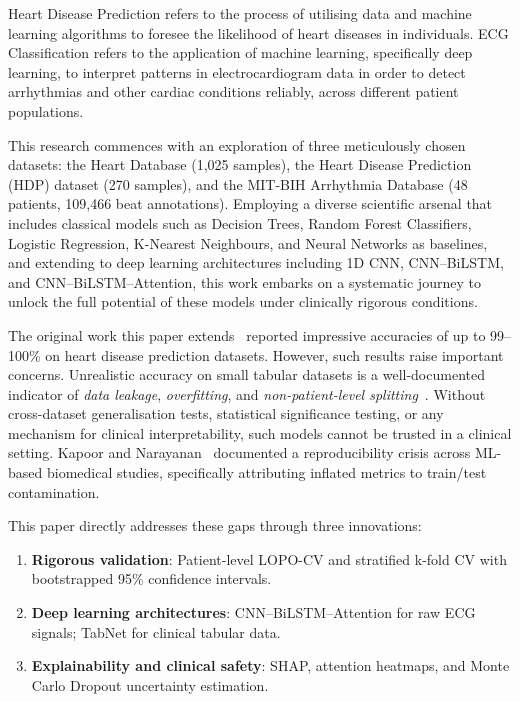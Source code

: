 \documentclass[10pt, twocolumn]{article}
\begin{document}
Heart Disease Prediction refers to the process of utilising data and machine learning
algorithms to foresee the likelihood of heart diseases in individuals.
ECG Classification refers to the application of machine learning, specifically deep learning,
to interpret patterns in electrocardiogram data in order to detect arrhythmias and other
cardiac conditions reliably, across different patient populations.

This research commences with an exploration of three meticulously chosen datasets: the Heart
Database (1,025 samples), the Heart Disease Prediction (HDP) dataset (270 samples), and the
MIT-BIH Arrhythmia Database (48 patients, 109,466 beat annotations).
Employing a diverse scientific arsenal that includes classical models such as Decision Trees,
Random Forest Classifiers, Logistic Regression, K-Nearest Neighbours, and Neural Networks
as baselines, and extending to deep learning architectures including 1D CNN, CNN--BiLSTM,
and CNN--BiLSTM--Attention, this work embarks on a systematic journey to unlock the full
potential of these models under clinically rigorous conditions.

\medskip
\noindent The original work this paper extends~\cite{anbuselvan2020} reported impressive
accuracies of up to 99--100\% on heart disease prediction datasets.
However, such results raise important concerns.
Unrealistic accuracy on small tabular datasets is a well-documented indicator of
\textit{data leakage}, \textit{overfitting}, and \textit{non-patient-level splitting}~\cite{kapoor2023}.
Without cross-dataset generalisation tests, statistical significance testing, or any mechanism
for clinical interpretability, such models cannot be trusted in a clinical setting.
Kapoor and Narayanan~\cite{kapoor2023} documented a reproducibility crisis across ML-based
biomedical studies, specifically attributing inflated metrics to train/test contamination.

This paper directly addresses these gaps through three innovations:
\begin{enumerate}[leftmargin=*, label=\textbf{\arabic*.}]
  \item \textbf{Rigorous validation}: Patient-level LOPO-CV and stratified k-fold CV with
        bootstrapped 95\% confidence intervals.
  \item \textbf{Deep learning architectures}: CNN--BiLSTM--Attention for raw ECG signals;
        TabNet for clinical tabular data.
  \item \textbf{Explainability and clinical safety}: SHAP, attention heatmaps, and
        Monte Carlo Dropout uncertainty estimation.
\end{enumerate}
\end{document}
